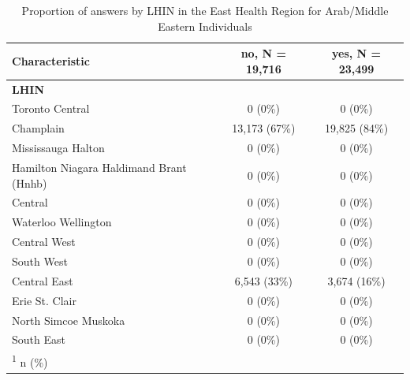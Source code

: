 \documentclass[
  letterpaper,
  DIV=11,
  numbers=noendperiod]{scrartcl}
\begin{document}
\hypertarget{tbl-East-region-Arab}{}
\begin{table}
\caption{\label{tbl-East-region-Arab}Proportion of answers by LHIN in the East Health Region for Arab/Middle
Eastern Individuals }\tabularnewline

\centering
\begin{tabular}{lcc}
\toprule
\textbf{Characteristic} & \textbf{no}, N = 19,716 & \textbf{yes}, N = 23,499\\
\midrule
\textbf{LHIN} &  & \\
\hspace{1em}Toronto \hspace{1em}Central & 0 (0\%) & 0 (0\%)\\
\hspace{1em}Champlain & 13,173 (67\%) & 19,825 (84\%)\\
\hspace{1em}Mississauga Halton & 0 (0\%) & 0 (0\%)\\
\hspace{1em}Hamilton Niagara Haldimand Brant (Hnhb) & 0 (0\%) & 0 (0\%)\\
Central & 0 (0\%) & 0 (0\%)\\
\hspace{1em}Waterloo Wellington & 0 (0\%) & 0 (0\%)\\
\hspace{1em}Central West & 0 (0\%) & 0 (0\%)\\
\hspace{1em}South West & 0 (0\%) & 0 (0\%)\\
\hspace{1em}Central East & 6,543 (33\%) & 3,674 (16\%)\\
\hspace{1em}Erie St. Clair & 0 (0\%) & 0 (0\%)\\
\hspace{1em}North Simcoe Muskoka & 0 (0\%) & 0 (0\%)\\
\hspace{1em}South East & 0 (0\%) & 0 (0\%)\\
\bottomrule
\multicolumn{3}{l}{\rule{0pt}{1em}\textsuperscript{1} n (\%)}\\
\end{tabular}
\end{table}
\end{document}
